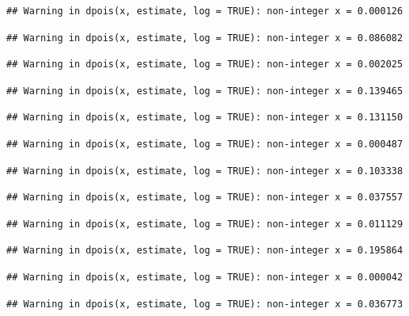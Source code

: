 \documentclass[]{article}
\begin{document}
\begin{verbatim}
## Warning in dpois(x, estimate, log = TRUE): non-integer x = 0.000126
\end{verbatim}

\begin{verbatim}
## Warning in dpois(x, estimate, log = TRUE): non-integer x = 0.086082
\end{verbatim}

\begin{verbatim}
## Warning in dpois(x, estimate, log = TRUE): non-integer x = 0.002025
\end{verbatim}

\begin{verbatim}
## Warning in dpois(x, estimate, log = TRUE): non-integer x = 0.139465
\end{verbatim}

\begin{verbatim}
## Warning in dpois(x, estimate, log = TRUE): non-integer x = 0.131150
\end{verbatim}

\begin{verbatim}
## Warning in dpois(x, estimate, log = TRUE): non-integer x = 0.000487
\end{verbatim}

\begin{verbatim}
## Warning in dpois(x, estimate, log = TRUE): non-integer x = 0.103338
\end{verbatim}

\begin{verbatim}
## Warning in dpois(x, estimate, log = TRUE): non-integer x = 0.037557
\end{verbatim}

\begin{verbatim}
## Warning in dpois(x, estimate, log = TRUE): non-integer x = 0.011129
\end{verbatim}

\begin{verbatim}
## Warning in dpois(x, estimate, log = TRUE): non-integer x = 0.195864
\end{verbatim}

\begin{verbatim}
## Warning in dpois(x, estimate, log = TRUE): non-integer x = 0.000042
\end{verbatim}

\begin{verbatim}
## Warning in dpois(x, estimate, log = TRUE): non-integer x = 0.036773
\end{verbatim}
\end{document}
